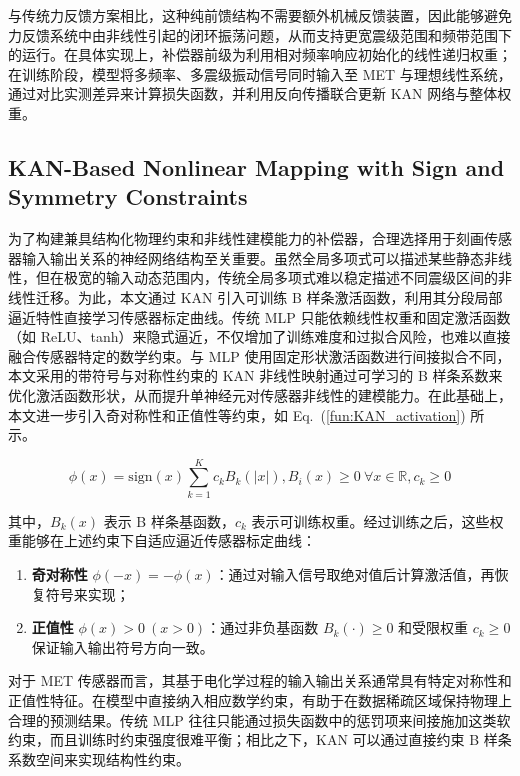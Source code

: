 \documentclass[sn-nature]{sn-jnl}
\begin{document}
与传统力反馈方案相比，这种纯前馈结构不需要额外机械反馈装置，因此能够避免力反馈系统中由非线性引起的闭环振荡问题，从而支持更宽震级范围和频带范围下的运行。在具体实现上，补偿器前级为利用相对频率响应初始化的线性递归权重；在训练阶段，模型将多频率、多震级振动信号同时输入至 MET 与理想线性系统，通过对比实测差异来计算损失函数，并利用反向传播联合更新 KAN 网络与整体权重。

\subsection{KAN-Based Nonlinear Mapping with Sign and Symmetry Constraints}

为了构建兼具结构化物理约束和非线性建模能力的补偿器，合理选择用于刻画传感器输入输出关系的神经网络结构至关重要。虽然全局多项式可以描述某些静态非线性，但在极宽的输入动态范围内，传统全局多项式难以稳定描述不同震级区间的非线性迁移。为此，本文通过 KAN 引入可训练 B 样条激活函数，利用其分段局部逼近特性直接学习传感器标定曲线。传统 MLP 只能依赖线性权重和固定激活函数（如 ReLU、tanh）来隐式逼近，不仅增加了训练难度和过拟合风险，也难以直接融合传感器特定的数学约束。与 MLP 使用固定形状激活函数进行间接拟合不同，本文采用的带符号与对称性约束的 KAN 非线性映射通过可学习的 B 样条系数来优化激活函数形状，从而提升单神经元对传感器非线性的建模能力\cite{livierisCKANNewApproach2024}。在此基础上，本文进一步引入奇对称性和正值性等约束，如 Eq.~(\ref{fun:KAN_activation}) 所示。

\begin{equation}
    \phi(x) = \text{sign}(x) \sum_{k=1}^{K} c_k B_k(|x|), B_i(x) \geq 0 \ \forall x \in \mathbb{R}, c_k \geq 0
    \label{fun:KAN_activation}
\end{equation}

其中，$B_k(x)$ 表示 B 样条基函数，$c_k$ 表示可训练权重。经过训练之后，这些权重能够在上述约束下自适应逼近传感器标定曲线：

\begin{enumerate}
    \item \textbf{奇对称性} $\phi(-x) = -\phi(x)$：通过对输入信号取绝对值后计算激活值，再恢复符号来实现；
    \item \textbf{正值性} $\phi(x) > 0\ (x > 0)$：通过非负基函数 $B_k(\cdot) \geq 0$ 和受限权重 $c_k \geq 0$ 保证输入输出符号方向一致。
\end{enumerate}

对于 MET 传感器而言，其基于电化学过程的输入输出关系通常具有特定对称性和正值性特征。在模型中直接纳入相应数学约束，有助于在数据稀疏区域保持物理上合理的预测结果。传统 MLP 往往只能通过损失函数中的惩罚项来间接施加这类软约束，而且训练时约束强度很难平衡；相比之下，KAN 可以通过直接约束 B 样条系数空间来实现结构性约束。
\end{document}
